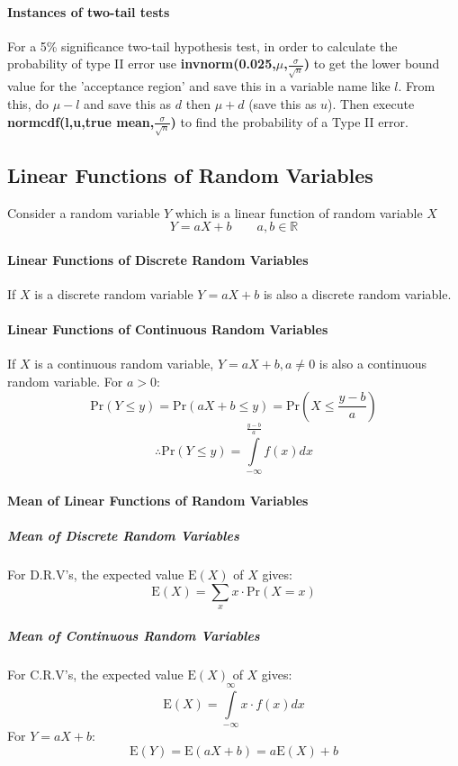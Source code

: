 \documentclass[a4paper,twoside]{article}
\begin{document}
				\paragraph{Instances of two-tail tests} For a 5\% significance two-tail hypothesis test, in order to calculate the probability of type II error use \textbf{invnorm(0.025,$\mu$,$\frac{\sigma}{\sqrt{n}}$)} to get the lower bound value for the 'acceptance region' and save this in a variable name like $l$. From this, do $\mu-l$ and save this as $d$ then $\mu+d$ (save this as $u$). Then execute \textbf{normcdf(l,u,true mean,$\frac{\sigma}{\sqrt{n}}$)} to find the probability of a Type II error.
		\subsection{Linear Functions of Random Variables}
			Consider a random variable $Y$ which is a linear function of random variable $X$
			\[
				Y=aX+b\qquad a,b\in\mathbb{R}
			\]
			
			\paragraph{Linear Functions of Discrete Random Variables} If $X$ is a discrete random variable $Y=aX+b$ is also a discrete random variable.
			
			\paragraph{Linear Functions of Continuous Random Variables} If $X$ is a continuous random variable, $Y=aX+b,a\neq0$ is also a continuous random variable. For $a>0$:
			\[
				\mathrm{Pr}(Y\leq y)=\mathrm{Pr}(aX+b\leq y)=\mathrm{Pr}\left(X\leq\frac{y-b}{a}\right)
			\]
			\[
				\therefore \mathrm{Pr}(Y\leq y)=\int\limits_{-\infty}^{\frac{y-b}{a}}f(x)dx
			\]
			
			\paragraph{Mean of Linear Functions of Random Variables}
				\subparagraph{Mean of Discrete Random Variables} For D.R.V's, the expected value $\mathrm{E}(X)$ of $X$ gives:
					\[
					\mathrm{E}(X)=\sum\limits_xx\cdot\mathrm{Pr}(X=x)
					\]
				\subparagraph{Mean of Continuous Random Variables} For C.R.V's, the expected value $\mathrm{E}(X)$ of $X$ gives:
					\[
					\mathrm{E}(X)=\int\limits_{-\infty}^{\infty}x\cdot f(x)dx
					\]
				For $Y=aX+b$:
				\[
					\mathrm{E}(Y)=\mathrm{E}(aX+b)=a\mathrm{E}(X)+b
				\]
			
\end{document}

